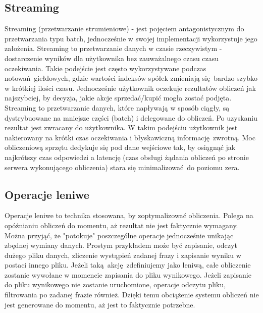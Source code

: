 \subsection{Streaming}\label{streaming_subsection}
Streaming (przetwarzanie strumieniowe) - jest pojęciem antagonistycznym do przetwarzania typu batch, jednocześnie w swojej implementacji wykorzystuje jego założenia. Streaming to przetwarzanie danych w czasie rzeczywistym - dostarczenie wyników dla użytkownika bez zauważalnego czasu czasu oczekiwania. Takie podejście jest często wykorzystywane podczas notowań giełdowych, gdzie wartości indeksów spółek zmieniają się bardzo szybko w krótkiej ilości czasu. Jednocześnie użytkownik oczekuje rezultatów obliczeń jak najszybciej, by decyzja, jakie akcje sprzedać/kupić mogła zostać podjęta. Streaming to przetwarzanie danych, które napływają w sposób ciągły, są dystrybuowane na mniejsze części (batch) i delegowane do obliczeń. Po uzyskaniu rezultat jest zwracany do użytkownika. W takim podejściu użytkownik jest nakierowany na krótki czas oczekiwania i błyskawiczną informację zwrotną. Moc obliczeniową sprzętu dedykuje się pod dane wejściowe tak, by osiągnąć jak najkrótszy czas odpowiedzi a latencję (czas obsługi żądania obliczeń po stronie serwera wykonującego obliczenia) stara się minimalizować do poziomu zera.
\subsection{Operacje leniwe}
Operacje leniwe to technika stosowana, by zoptymalizować obliczenia. Polega na opóźnianiu obliczeń do momentu, aż rezultat nie jest faktycznie wymagany. Można przyjąć, że "potokuje" poszczególne operacje jednocześnie unikając zbędnej wymiany danych. Prostym przykładem może być zapisanie, odczyt dużego pliku danych, zliczenie wystąpień zadanej frazy i zapisanie wyniku w postaci innego pliku. Jeżeli taką akcję zdefiniujemy jako leniwą, całe obliczenie zostanie wywołane w momencie zapisania do pliku wynikowego. Jeżeli zapisanie do pliku wynikowego nie zostanie uruchomione, operacje odczytu pliku, filtrowania po zadanej frazie również. Dzięki temu obciążenie systemu obliczeń nie jest generowane do momentu, aż jest to faktycznie potrzebne.

